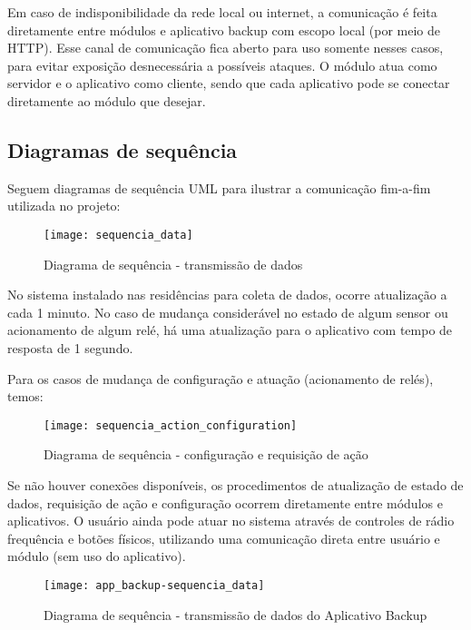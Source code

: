 Em caso de indisponibilidade da rede local ou internet, a comunicação é feita diretamente entre módulos e aplicativo backup com escopo local (por meio de HTTP). Esse canal de comunicação fica aberto para uso somente nesses casos, para evitar exposição desnecessária a possíveis ataques. O módulo atua como servidor e o aplicativo como cliente, sendo que cada aplicativo pode se conectar diretamente ao módulo que desejar.

\subsection{Diagramas de sequência}

Seguem diagramas de sequência UML para ilustrar a comunicação fim-a-fim utilizada no projeto:

\begin{figure}[H]
	\centering
	\caption{Diagrama de sequência - transmissão de dados}
	\texttt{[image: sequencia\_data]}
	\label{fig:sequencia_data}
\end{figure}

No sistema instalado nas residências para coleta de dados, ocorre atualização a cada 1 minuto. No caso de mudança considerável no estado de algum sensor ou acionamento de algum relé, há uma atualização para o aplicativo com tempo de resposta de 1 segundo.

Para os casos de mudança de configuração e atuação (acionamento de relés), temos:

\begin{figure}[H]
	\centering
	\caption{Diagrama de sequência - configuração e requisição de ação}
	\texttt{[image: sequencia\_action\_configuration]}
	\label{fig:sequencia_action_configuration}
\end{figure}

Se não houver conexões disponíveis, os procedimentos de atualização de estado de dados, requisição de ação e configuração ocorrem diretamente entre módulos e aplicativos. O usuário ainda pode atuar no sistema através de controles de rádio frequência e botões físicos, utilizando uma comunicação direta entre usuário e módulo (sem uso do aplicativo).

\begin{figure}[H]
	\centering
	\caption{Diagrama de sequência - transmissão de dados do Aplicativo Backup}
	\texttt{[image: app\_backup-sequencia\_data]}
	\label{fig:app_backup-sequencia_data}
\end{figure}

